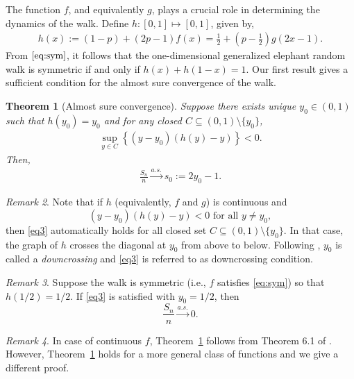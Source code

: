\documentclass[12pt]{amsart}
\theoremstyle{plain}
\newtheorem{theorem}{Theorem}[section]
\theoremstyle{remark}
\newtheorem{remark}[theorem]{Remark}
\numberwithin{equation}{section}
\begin{document}
The function $f$, and equivalently $g$, plays a crucial role in determining the dynamics of the walk. Define $h : [0,1] \mapsto [0,1]$, given by, \begin{align}\label{eq:h} h(x) := (1-p) + (2p-1)f(x) = \frac{1}{2}+\left(p-\frac{1}{2}\right)g(2x-1). \end{align} From $\eqref{eq:sym}$, it follows that the one-dimensional generalized elephant random walk is symmetric if and only if $h(x)+h(1-x) = 1$. Our first result gives a sufficient condition for the almost sure convergence of the walk. 
\begin{theorem}[Almost sure convergence]\label{thm:slln}
Suppose there exists unique $y_0 \in (0,1)$ such that $h(y_0) = y_0$ 
and for any closed $C \subseteq (0,1)\setminus \{y_0\}$, 
\begin{align}\label{eq3}
    \sup_{y \in C} \left\{(y-y_0)\left(h(y) - y\right)\right\} < 0.
\end{align}
Then, 
\begin{align}\label{eq:ldrw-conv}
\frac{S_n}{n} \stackrel{a.s.}{\to} s_0 := 2y_0 - 1.
\end{align}
\end{theorem}

\begin{remark}
Note that if $h$ (equivalently, $f$ and $g$) is continuous and 
\[
   (y-y_0)\left(h(y) - y\right) < 0 \text{ for all } y \neq y_0,
\]
then \eqref{eq3} automatically holds for all closed set $C \subseteq (0,1)\setminus \{y_0\}$. In that case, the graph of $h$ crosses the diagonal at $y_0$ from above to below. {Following \cite{hill1980strong}, $y_0$ is called a \emph{downcrossing} and \eqref{eq3} is referred to as downcrossing condition.}
\end{remark}

\begin{remark}
Suppose the walk is symmetric (i.e., $f$ satisfies \eqref{eq:sym}) so that $h(1/2) = 1/2$. If \eqref{eq3} is satisfied with $y_0 = 1/2$, then \[
   \frac{S_n}{n} \stackrel{a.s.}{\to} 0.
\]
\end{remark}

\begin{remark}
    {In case of continuous $f$, Theorem~\ref{thm:slln} follows from Theorem 6.1 of \cite{hill1980strong}. However, Theorem~\ref{thm:slln} holds for a more general class of functions and we give a different proof.}
\end{remark}
\end{document}
